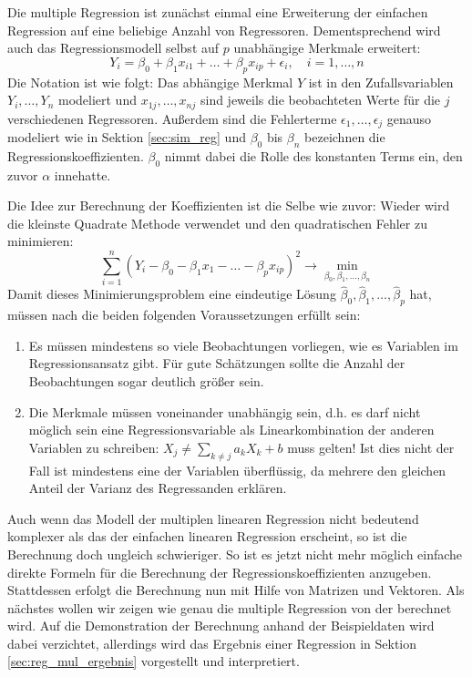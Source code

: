 Die multiple Regression ist zunächst einmal eine Erweiterung der einfachen Regression auf eine beliebige Anzahl von Regressoren.
Dementsprechend wird auch das Regressionsmodell selbst auf $p$ unabhängige Merkmale erweitert:
\begin{equation*}
  Y_i = \beta_0 + \beta_1 x_{i1} + \dots + \beta_p x_{ip} + \epsilon_i, \quad i = 1, \dots, n
\end{equation*}
Die Notation ist wie folgt:
Das abhängige Merkmal $Y$ ist in den Zufallsvariablen $Y_i, \dots, Y_n$ modeliert und $x_{1j}, \dots, x_{nj}$ sind jeweils die beobachteten Werte für die $j$ verschiedenen Regressoren.
Außerdem sind die Fehlerterme $\epsilon_1, \dots, \epsilon_j$ genauso modeliert wie in Sektion \ref{sec:sim_reg} und $\beta_0$ bis $\beta_n$ bezeichnen die Regressionskoeffizienten.
$\beta_0$ nimmt dabei die Rolle des konstanten Terms ein, den zuvor $\alpha$ innehatte.

Die Idee zur Berechnung der Koeffizienten ist die Selbe wie zuvor:
Wieder wird die kleinste Quadrate Methode verwendet und den quadratischen Fehler zu minimieren:
\begin{equation*}
  \label{eq:kq_mul}
  \sum\limits_{i=1}^{n} (Y_i - \beta_0 -\beta_1 x_1 - \dots - \beta_p x_{ip})^2 \rightarrow \min\limits_{\beta_0,\beta_1,\dots,\beta_n}
\end{equation*}
Damit dieses Minimierungsproblem eine eindeutige Lösung $\hat\beta_0, \hat\beta_1, \dots, \hat\beta_p$ hat, müssen nach \citep[S.496]{Fahrmeir2010} die beiden folgenden Voraussetzungen erfüllt sein:
\begin{enumerate}
  \item Es müssen mindestens so viele Beobachtungen vorliegen, wie es Variablen im Regressionsansatz gibt. 
    Für gute Schätzungen sollte die Anzahl der Beobachtungen sogar deutlich größer sein.
  \item Die Merkmale müssen voneinander unabhängig sein, d.h. es darf nicht möglich sein eine Regressionsvariable als Linearkombination der anderen Variablen zu schreiben: $X_j \neq \sum\limits_{k\neq j} a_k X_k + b$ muss gelten!
    Ist dies nicht der Fall ist mindestens eine der Variablen überflüssig, da mehrere den gleichen Anteil der Varianz des Regressanden erklären.  
\end{enumerate}

Auch wenn das Modell der multiplen linearen Regression nicht bedeutend komplexer als das der einfachen linearen Regression erscheint, so ist die Berechnung doch ungleich schwieriger.
So ist es jetzt nicht mehr möglich einfache direkte Formeln für die Berechnung der Regressionskoeffizienten anzugeben.
Stattdessen erfolgt die Berechnung nun mit Hilfe von Matrizen und Vektoren.
Als nächstes wollen wir zeigen wie genau die multiple Regression von der \naglib berechnet wird.
Auf die Demonstration der Berechnung anhand der Beispieldaten wird dabei verzichtet, allerdings wird das Ergebnis einer Regression in Sektion \ref{sec:reg_mul_ergebnis} vorgestellt und interpretiert.

